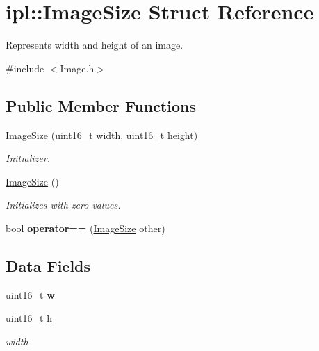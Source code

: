 \hypertarget{structipl_1_1ImageSize}{
\section{ipl::ImageSize Struct Reference}
\label{structipl_1_1ImageSize}
}


Represents width and height of an image.  




{\ttfamily \#include $<$Image.h$>$}

\subsection*{Public Member Functions}
\begin{DoxyCompactItemize}
\item 
\hypertarget{structipl_1_1ImageSize_aa88bbc69efd0309fe29121520109792f}{
\hyperlink{structipl_1_1ImageSize_aa88bbc69efd0309fe29121520109792f}{ImageSize} (uint16\_\-t width, uint16\_\-t height)}
\label{structipl_1_1ImageSize_aa88bbc69efd0309fe29121520109792f}

\begin{DoxyCompactList}\small\item\em Initializer. \end{DoxyCompactList}\item 
\hypertarget{structipl_1_1ImageSize_a40ad507610dd2955d896c94a218061fd}{
\hyperlink{structipl_1_1ImageSize_a40ad507610dd2955d896c94a218061fd}{ImageSize} ()}
\label{structipl_1_1ImageSize_a40ad507610dd2955d896c94a218061fd}

\begin{DoxyCompactList}\small\item\em Initializes with zero values. \end{DoxyCompactList}\item 
\hypertarget{structipl_1_1ImageSize_a49d2ca74a19e604a5f18d6b3998fd7b4}{
bool {\bfseries operator==} (\hyperlink{structipl_1_1ImageSize}{ImageSize} other)}
\label{structipl_1_1ImageSize_a49d2ca74a19e604a5f18d6b3998fd7b4}

\end{DoxyCompactItemize}
\subsection*{Data Fields}
\begin{DoxyCompactItemize}
\item 
\hypertarget{structipl_1_1ImageSize_af4d93869d748507ed999b4560ae3ed49}{
uint16\_\-t {\bfseries w}}
\label{structipl_1_1ImageSize_af4d93869d748507ed999b4560ae3ed49}

\item 
\hypertarget{structipl_1_1ImageSize_a31ec0e02678a4114a95076a60a2a24af}{
uint16\_\-t \hyperlink{structipl_1_1ImageSize_a31ec0e02678a4114a95076a60a2a24af}{h}}
\label{structipl_1_1ImageSize_a31ec0e02678a4114a95076a60a2a24af}

\begin{DoxyCompactList}\small\item\em width \end{DoxyCompactList}\end{DoxyCompactItemize}


